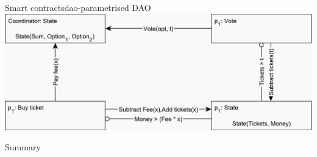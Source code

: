 \documentclass{beamer}
\begin{document}
\begin{frame}{Smart contracts}{dao-parametrised DAO}
	\centering
	\includegraphics[scale=0.5]{figures/dao-parametrised.pdf}
\end{frame}

\begin{frame}{Summary}%

\end{frame}
\end{document}
